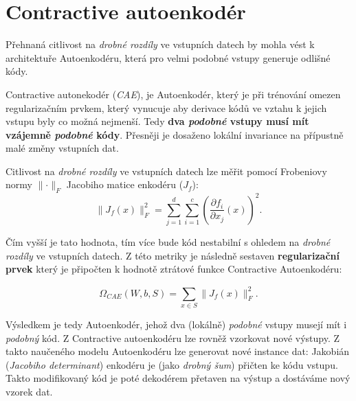 \section{Contractive autoenkodér}
Přehnaná citlivost na \emph{drobné rozdíly} ve vstupních datech by mohla vést k architektuře Autoenkodéru, která pro velmi podobné vstupy generuje odlišné kódy.

Contractive autonekodér (\emph{CAE}), je Autoenkodér, který je při trénování omezen regularizačním prvkem,
který vynucuje aby derivace kódů ve vztahu k jejich vstupu byly co možná nejmenší.
Tedy \textbf{dva \emph{podobné} vstupy musí mít vzájemně \emph{podobné} kódy}.
Přesněji je dosaženo lokální invariance na přípustně malé změny vstupních dat.

Citlivost na \emph{drobné rozdíly} ve vstupních datech lze měřit pomocí Frobeniovy normy $\lVert \cdot \rVert_F$ Jacobiho matice enkodéru ($J_f$):
\begin{equation}
    \lVert J_f(x) \rVert^2_F = \sum_{j=1}^{d}\sum_{i=1}^{c} \left( \frac{\partial f_i}{\partial x_j} (x) \right) ^2 .
\end{equation}

Čím vyšší je tato hodnota, tím více bude kód nestabilní s ohledem na \emph{drobné rozdíly} ve vstupních datech.
Z této metriky je následně sestaven \textbf{regularizační prvek} který je připočten k hodnotě ztrátové funkce Contractive Autoenkodéru:

\begin{equation}
    \Omega_{CAE} (W, b, S) = \sum_{x \in S}^{} \lVert J_f(x) \rVert^2_F .
\end{equation}

Výsledkem je tedy Autoenkodér, jehož dva (lokálně) \emph{podobné} vstupy musejí mít i \emph{podobný} kód.
Z Contractive autoenkodéru lze rovněž vzorkovat nové výstupy.
Z takto naučeného modelu Autoenkodéru lze generovat nové instance dat:
Jakobián (\emph{Jacobiho determinant}) enkodéru je (jako \emph{drobný šum}) přičten ke kódu vstupu.
Takto modifikovaný kód je poté dekodérem přetaven na výstup a dostáváme nový vzorek dat.